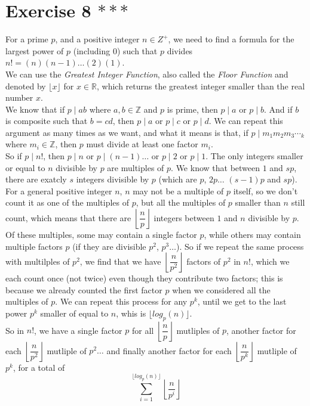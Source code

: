 \documentclass[12pt]{article}
\newcommand{\Z}{\mathbb{Z}}
\newcommand{\R}{\mathbb{R}}
\begin{document}
    \section*{Exercise 8 $***$}
    For a prime $p$,
    and a positive integer $n \in Z^+$,
    we need to find a formula for the largest power of $p$
    (including $0$)
    such that $p$ divides $n! = (n)(n-1)\dots(2)(1)$. \\
    We can use the \textit{Greatest Integer Function},
    also called the \textit{Floor Function}
    and denoted by $\lfloor x \rfloor$ for $x \in \R$,
    which returns the greatest integer
    smaller than the real number $x$. \\
    We know that if $p \mid ab$ where $a, b \in \Z$ and $p$ is prime,
    then $p \mid a$ or $p \mid b$.
    And if $b$ is composite such that $b = cd$,
    then $p \mid a$ or $p \mid c$ or $p \mid d$.
    We can repeat this argument as many times as we want,
    and what it means is that,
    if $p \mid m_1m_2m_3\dotsm_k$ where $m_i \in \Z$,
    then $p$ must divide at least one factor $m_i$. \\
    So if $p \mid n!$,
    then $p \mid n$ or $p \mid (n-1) \dots$
    or $p \mid 2$ or $p \mid 1$.
    The only integers smaller or equal to $n$ divisible by $p$
    are multiples of $p$.
    We know that between $1$ and $sp$,
    there are exatcly $s$ integers divisible by $p$
    (which are $p$, $2p\dots$ $(s-1)p$ and $sp$).
    For a general positive integer $n$,
    $n$ may not be a multiple of $p$ itself,
    so we don't count it as one of the multiples of $p$,
    but all the multiples of $p$ smaller than $n$ still count,
    which means that there are
    $\left\lfloor \dfrac{n}{p} \right\rfloor$
    integers between $1$ and $n$ divisible by $p$. \\
    Of these multiples, some may contain a single factor $p$,
    while others may contain multiple factors $p$
    (if they are divisible $p^2$, $p^3 \dots$).
    So if we repeat the same process with multilples of $p^2$,
    we find that we have $\left\lfloor \dfrac{n}{p^2} \right\rfloor$
    factors of $p^2$ in $n!$,
    which we each count once (not twice)
    even though they contribute two factors;
    this is because we already counted the first factor $p$
    when we considered all the multiples of $p$.
    We can repeat this process for any $p^k$,
    until we get to the last power $p^k$ smaller of equal to $n$,
    whis is $\lfloor log_p(n) \rfloor$. \\
    So in $n!$, we have a single factor $p$
    for all $\left\lfloor \dfrac{n}{p} \right\rfloor$ mutliples of $p$,
    another factor for each $\left\lfloor \dfrac{n}{p^2} \right\rfloor$
    mutliple of $p^2 \dots$
    and finally another factor for each 
    $\left\lfloor \dfrac{n}{p^k} \right\rfloor$ mutliple of $p^k$,
    for a total of
    \[ \sum_{i = 1}^{\lfloor log_p(n) \rfloor}
    \left\lfloor \dfrac{n}{p^i} \right\rfloor \]
\end{document}
